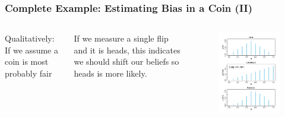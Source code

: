 \documentclass[usenames,dvipsnames,table]{beamer}
\begin{document}
\begin{frame}
\frametitle{Complete Example: Estimating Bias in a Coin (II)}
\begin{columns}[c]
Qualitatively: If we assume a coin is most probably fair

\vspace{1em}
If we measure a single flip and it is heads, this indicates we should shift our beliefs so heads is more likely.

\begin{figure}
\centering
\includegraphics[width=\linewidth]{img/fig5_1}
\end{figure}
\end{columns}
\end{frame}
\end{document}
